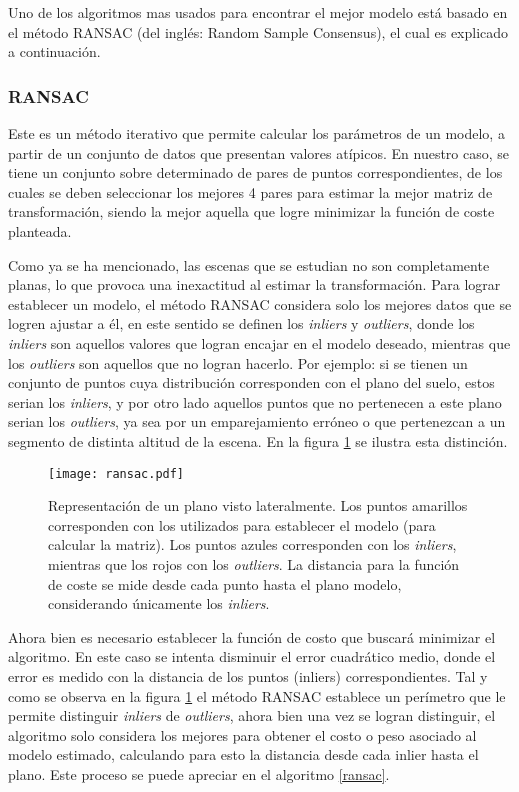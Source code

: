 Uno de los algoritmos mas usados para encontrar el mejor modelo está basado en el método RANSAC (del inglés: Random Sample Consensus), el cual es explicado a continuación.

\subsubsection*{RANSAC}

Este es un método iterativo que permite calcular los parámetros de un modelo, a partir de un conjunto de datos que presentan valores atípicos. En nuestro caso, se tiene un conjunto sobre determinado de pares de puntos correspondientes, de los cuales se deben seleccionar los mejores 4 pares para estimar la mejor matriz de transformación, siendo la mejor aquella que logre minimizar la función de coste planteada.


Como ya se ha mencionado, las escenas que se estudian no son completamente planas, lo que provoca una inexactitud al estimar la transformación. Para lograr establecer un modelo, el método RANSAC considera solo los mejores datos que se logren ajustar a él, en este sentido se definen los \textit{inliers} y \textit{outliers}, donde los \textit{inliers} son aquellos valores que logran encajar en el modelo deseado, mientras que los \textit{outliers} son aquellos que no logran hacerlo. Por ejemplo: si se tienen un conjunto de puntos cuya distribución corresponden con el plano del suelo, estos serian los \textit{inliers}, y por otro lado aquellos puntos que no pertenecen a este plano serian los \textit{outliers}, ya sea por un emparejamiento erróneo o que pertenezcan a un segmento de distinta altitud de la escena. En la figura \ref{imagen:ransac} se ilustra esta distinción.

\begin{figure}[h]
	\centering
	\texttt{[image: ransac.pdf]}
	\caption[Mejor modelo - RANSAC]{Representación de un plano visto lateralmente. Los puntos amarillos corresponden con los utilizados para establecer el modelo (para calcular la matriz). Los puntos azules corresponden con los \textit{inliers}, mientras que los rojos con los \textit{outliers}. La distancia para la función de coste se mide desde cada punto hasta el plano modelo, considerando únicamente los \textit{inliers}.}
	\label{imagen:ransac}
\end{figure}

Ahora bien es necesario establecer la función de costo que buscará minimizar el algoritmo. En este caso se intenta disminuir el error cuadrático medio, donde el error es medido con la distancia de los puntos (inliers) correspondientes. Tal y como se observa en la figura \ref{imagen:ransac} el método RANSAC establece un perímetro que le permite distinguir \textit{inliers} de \textit{outliers}, ahora bien una vez se logran distinguir, el algoritmo solo considera los mejores para obtener el costo o peso asociado al modelo estimado, calculando para esto la distancia desde cada inlier hasta el plano. Este proceso se puede apreciar en el algoritmo \ref{ransac}.

